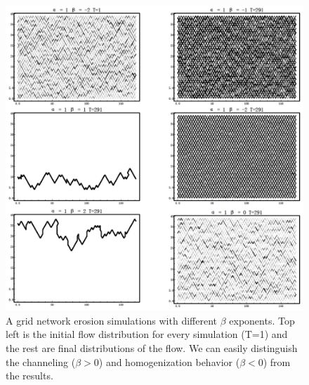 \begin{figure}[H]
  \centerline{\includegraphics[width=1\textwidth]{./Figs/erosionExp.png}}
  \caption{A grid network erosion simulations with different $\beta$ exponents. Top left is the initial flow distribution for every simulation (T=1) and the rest are final distributions of the flow. We can easily distinguish the channeling ($\beta>0$) and homogenization behavior ($\beta<0$) from the results. }
\label{fig:erosionExp}
\end{figure}  

